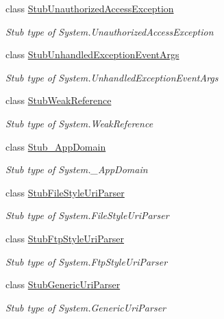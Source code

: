 \begin{DoxyCompactItemize}
class \hyperlink{class_system_1_1_fakes_1_1_stub_unauthorized_access_exception}{Stub\-Unauthorized\-Access\-Exception}
\begin{DoxyCompactList}\small\item\em Stub type of System.\-Unauthorized\-Access\-Exception\end{DoxyCompactList}\item 
class \hyperlink{class_system_1_1_fakes_1_1_stub_unhandled_exception_event_args}{Stub\-Unhandled\-Exception\-Event\-Args}
\begin{DoxyCompactList}\small\item\em Stub type of System.\-Unhandled\-Exception\-Event\-Args\end{DoxyCompactList}\item 
class \hyperlink{class_system_1_1_fakes_1_1_stub_weak_reference}{Stub\-Weak\-Reference}
\begin{DoxyCompactList}\small\item\em Stub type of System.\-Weak\-Reference\end{DoxyCompactList}\item 
class \hyperlink{class_system_1_1_fakes_1_1_stub___app_domain}{Stub\-\_\-\-App\-Domain}
\begin{DoxyCompactList}\small\item\em Stub type of System.\-\_\-\-App\-Domain\end{DoxyCompactList}\item 
class \hyperlink{class_system_1_1_fakes_1_1_stub_file_style_uri_parser}{Stub\-File\-Style\-Uri\-Parser}
\begin{DoxyCompactList}\small\item\em Stub type of System.\-File\-Style\-Uri\-Parser\end{DoxyCompactList}\item 
class \hyperlink{class_system_1_1_fakes_1_1_stub_ftp_style_uri_parser}{Stub\-Ftp\-Style\-Uri\-Parser}
\begin{DoxyCompactList}\small\item\em Stub type of System.\-Ftp\-Style\-Uri\-Parser\end{DoxyCompactList}\item 
class \hyperlink{class_system_1_1_fakes_1_1_stub_generic_uri_parser}{Stub\-Generic\-Uri\-Parser}
\begin{DoxyCompactList}\small\item\em Stub type of System.\-Generic\-Uri\-Parser\end{DoxyCompactList}\item 

\end{DoxyCompactItemize}
